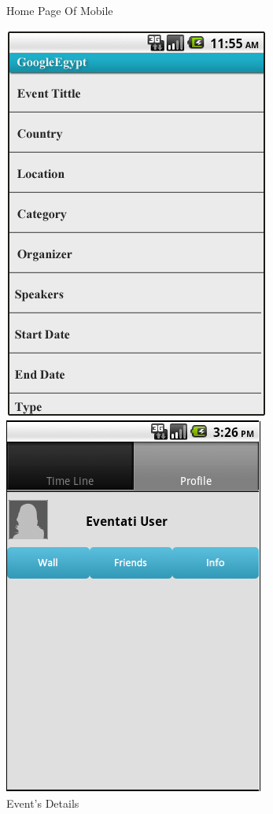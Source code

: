 \documentclass[12pt,a4paper,class,twoside,openany]{report}
\begin{document}
{\begin{figure}
\begin{minipage}[b]{0.5\linewidth}
	\caption{Home Page Of Mobile }
	\label{fg:8-10}
	\end{minipage}
	\end{figure}
\begin{figure}
	\begin{minipage}[b]{0.5\linewidth}
	\centering
	\includegraphics[height=4 in]{8-11}
	\caption{Event's Details }
     \label{fg:8-11}
	\end{minipage}
	\hspace{0.5cm}
	\begin{minipage}[b]{0.5\linewidth}
	\centering
	\includegraphics[width=\textwidth]{8-12}

\end{minipage}
\end{figure}}
\end{document}
